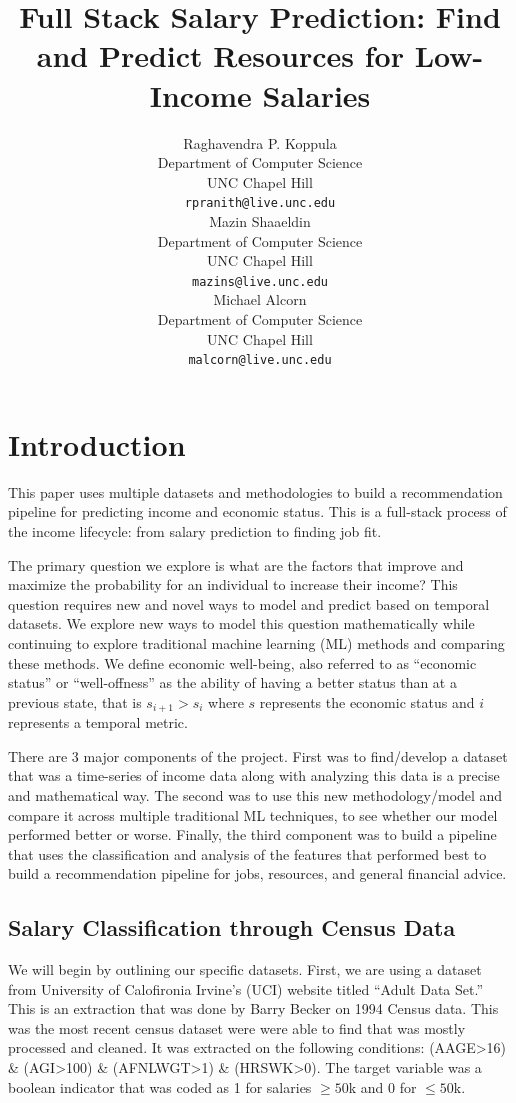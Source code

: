 \documentclass{article}
\title{Full Stack Salary Prediction: Find and Predict Resources for Low-Income Salaries}
\author{%
  Raghavendra P. Koppula \\
  Department of Computer Science\\
  UNC Chapel Hill\\
  \texttt{rpranith@live.unc.edu} \\
  \And
  Mazin Shaaeldin \\
  Department of Computer Science\\
  UNC Chapel Hill\\
  \texttt{mazins@live.unc.edu} \\
  \And
  Michael Alcorn \\
  Department of Computer Science\\
  UNC Chapel Hill\\
  \texttt{malcorn@live.unc.edu} \\
}
\begin{document}
\maketitle

\section{Introduction}

This paper uses multiple datasets and methodologies to build a recommendation pipeline for predicting income and economic status. This is a full-stack process of the income lifecycle: from salary prediction to finding job fit.

The primary question we explore is what are the factors that improve and maximize the probability for an individual to increase their income? This question requires new and novel ways to model and predict based on temporal datasets. We explore new ways to model this question mathematically while continuing to explore traditional machine learning (ML) methods and comparing these methods. We define economic well-being, also referred to as “economic status” or “well-offness” as the ability of having a better status than at a previous state, that is $s_{i+1} > s_i$ where $s$ represents the economic status and $i$ represents a temporal metric.

There are 3 major components of the project. First was to find/develop a dataset that was a time-series of income data along with analyzing this data is a precise and mathematical way. The second was to use this new methodology/model and compare it across multiple traditional ML techniques, to see whether our model performed better or worse. Finally, the third component was to build a pipeline that uses the classification and analysis of the features that performed best to build a recommendation pipeline for jobs, resources, and general financial advice. 


\subsection{Salary Classification through Census Data}

We will begin by outlining our specific datasets. First, we are using a dataset from University of Calofironia Irvine's (UCI) website titled “Adult Data Set.” This is an extraction that was done by Barry Becker on 1994 Census data. This was the most recent census dataset were were able to find that was mostly processed and cleaned. It was extracted on the following conditions: (AAGE>16) \& (AGI>100) \& (AFNLWGT>1) \& (HRSWK>0). The target variable was a boolean indicator that was coded as 1 for salaries $\ge 50$k and 0 for $\le 50$k. 
\end{document}
